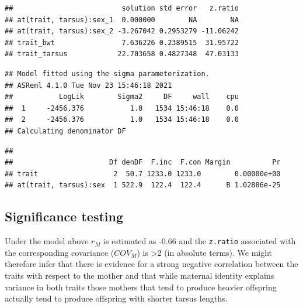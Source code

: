 \documentclass[
  12pt,
]{book}
\newenvironment{Shaded}{\begin{snugshade}}{\end{snugshade}}
\newcommand{\DataTypeTok}[1]{\textcolor[rgb]{0.13,0.29,0.53}{#1}}
\newcommand{\DecValTok}[1]{\textcolor[rgb]{0.00,0.00,0.81}{#1}}
\newcommand{\KeywordTok}[1]{\textcolor[rgb]{0.13,0.29,0.53}{\textbf{#1}}}
\newcommand{\NormalTok}[1]{#1}
\newcommand{\OperatorTok}[1]{\textcolor[rgb]{0.81,0.36,0.00}{\textbf{#1}}}
\newcommand{\OtherTok}[1]{\textcolor[rgb]{0.56,0.35,0.01}{#1}}
\newcommand{\StringTok}[1]{\textcolor[rgb]{0.31,0.60,0.02}{#1}}
\begin{document}
\begin{Shaded}
\end{Shaded}

\begin{verbatim}
##                          solution std error   z.ratio
## at(trait, tarsus):sex_1  0.000000        NA        NA
## at(trait, tarsus):sex_2 -3.267042 0.2953279 -11.06242
## trait_bwt                7.636226 0.2389515  31.95722
## trait_tarsus            22.703658 0.4827348  47.03133
\end{verbatim}

\begin{verbatim}
## Model fitted using the sigma parameterization.
## ASReml 4.1.0 Tue Nov 23 15:46:18 2021
##           LogLik        Sigma2     DF     wall    cpu
##  1     -2456.376           1.0   1534 15:46:18    0.0
##  2     -2456.376           1.0   1534 15:46:18    0.0
## Calculating denominator DF
\end{verbatim}

\begin{verbatim}
## 
##                       Df denDF  F.inc  F.con Margin          Pr
## trait                  2  50.7 1233.0 1233.0        0.00000e+00
## at(trait, tarsus):sex  1 522.9  122.4  122.4      B 1.02886e-25
\end{verbatim}

\hypertarget{significance-testing}{%
\subsection{Significance testing}\label{significance-testing}}

Under the model above \(r_M\) is estimated as -0.66 and the \texttt{z.ratio} associated with the corresponding covariance (\(COV_M\)) is \textgreater2 (in absolute terms). We might therefore infer that there is evidence for a strong negative correlation between the traits with respect to the mother and that while maternal identity explains variance in both traits those mothers that tend to produce heavier offspring actually tend to produce offspring with shorter tarsus lengths.
\end{document}
